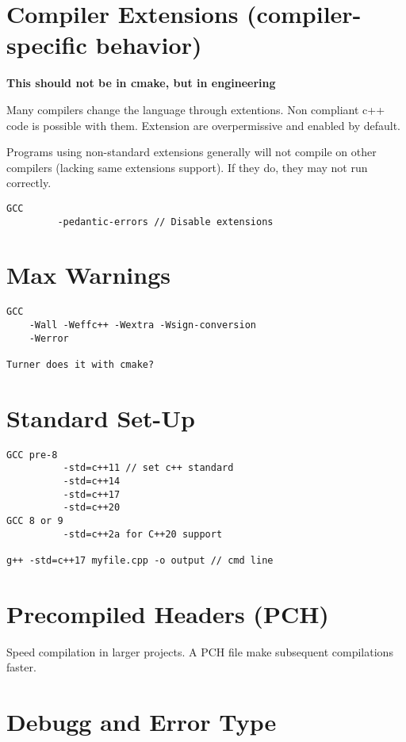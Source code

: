 \section{Compiler Extensions (compiler-specific behavior)}


\textbf{This should not be in cmake, but in engineering}


Many compilers change the language through extentions. Non compliant c++ code is possible with them.
Extension are overpermissive and enabled by default.


Programs using non-standard extensions generally will not compile on other compilers 
(lacking same extensions support). If they do, they may not run correctly.

\begin{verbatim}
GCC
         -pedantic-errors // Disable extensions
\end{verbatim}

\section{Max Warnings}

\begin{verbatim}
GCC 
    -Wall -Weffc++ -Wextra -Wsign-conversion
    -Werror

Turner does it with cmake?
\end{verbatim}

\section{Standard Set-Up}

\begin{verbatim}
GCC pre-8
          -std=c++11 // set c++ standard
          -std=c++14
          -std=c++17
          -std=c++20 
GCC 8 or 9
          -std=c++2a for C++20 support

g++ -std=c++17 myfile.cpp -o output // cmd line
\end{verbatim}

\section{Precompiled Headers (PCH)}

Speed compilation in larger projects. A PCH file make subsequent compilations faster.




\section{Debugg and Error Type}

